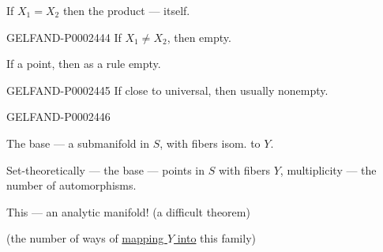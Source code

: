 If $X_1=X_2$ then the product — itself.



\begin{GelfandAdjacentEvidence}{GELFAND-P000244}{4}
If $X_1\ne X_2$, then empty.



\end{GelfandAdjacentEvidence}

If a point, then as a rule empty.



\begin{GelfandAdjacentEvidence}{GELFAND-P000244}{5}
If close to universal, then usually nonempty.




\end{GelfandAdjacentEvidence}
\begin{GelfandAdjacentEvidence}{GELFAND-P000244}{6}

The base — a submanifold in $S$, with fibers isom. to $Y$.



\end{GelfandAdjacentEvidence}

Set-theoretically — the base — points in $S$ with fibers $Y$, multiplicity — the number of automorphisms.



This — an analytic manifold! (a difficult theorem)



(the number of ways of \underline{mapping $Y$ into} this family)



